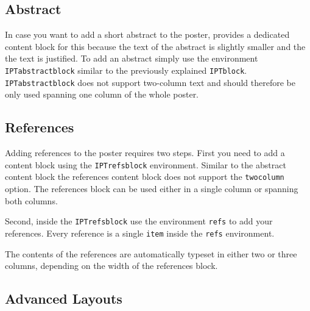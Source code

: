 
\subsection{Abstract}

In case you want to add a short abstract to the poster, \tugPoster{} provides a dedicated content block for this because the text of the abstract is slightly smaller and the the text is justified. To add an abstract simply use the environment \texttt{IPTabstractblock} similar to the previously explained \texttt{IPTblock}. \texttt{IPTabstractblock} does not support two-column text and should therefore be only used spanning one column of the whole poster.



\subsection{References}

Adding references to the poster requires two steps. First you need to add a content block using the \texttt{IPTrefsblock} environment. Similar to the abstract content block the references content block does not support the \texttt{twocolumn} option. The references block can be used either in a single column or spanning both columns.

Second, inside the \texttt{IPTrefsblock} use the environment \texttt{refs} to add your references. Every reference is a single \texttt{\bs{}item} inside the \texttt{refs} environment. 

The contents of the references are automatically typeset in either two or three columns, depending on the width of the references block.


\subsection{Advanced Layouts}

